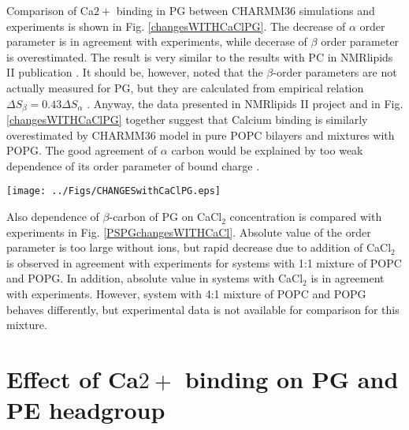 \documentclass[aps,prl,superscriptaddress,twocolumn]{revtex4}
\begin{document}
Comparison of Ca$2+$ binding in PG between CHARMM36 simulations and experiments \cite{borle85}
is shown in Fig. \ref{changesWITHCaClPG}. The decrease of $\alpha$ order parameter
is in agreement with experiments, while decerase of $\beta$ order parameter is overestimated.
The result is very similar to the results with PC in NMRlipids II publication \cite{catte16}.
It should be, however, noted that the $\beta$-order parameters are not actually measured for PG,
but they are calculated from empirical relation $\Delta S_{\beta}=0.43\Delta S_{\alpha}$ \cite{akutsu81}.
Anyway, the data presented in NMRlipids II project and in Fig. \ref{changesWITHCaClPG} together
suggest that Calcium binding is similarly overestimated by CHARMM36 model in pure POPC bilayers and mixtures with
POPG. The good agreement of $\alpha$ carbon would be explained by too weak dependence of its order
parameter of bound charge
.
\begin{figure*}[]
  \centering
  \texttt{[image: ../Figs/CHANGESwithCaClPG.eps]}
  \caption{\label{changesWITHCaClPG}
    PG order parameters as a function CaCl$_2$ concentration from experiments \cite{borle85} and CHARMM36 simulations.
    Note that beta order parameter is calculated from empirical relation $\Delta S_{\beta}=0.43\Delta S_{\alpha}$ \cite{akutsu81}, not actually measured. 
  }
\end{figure*}

Also dependence of $\beta$-carbon of PG on CaCl$_2$ concentration is compared with
experiments \cite{borle85} in Fig. \ref{PSPGchangesWITHCaCl}. Absolute value of
the order parameter is too large without ions, but rapid decrease due to addition of
CaCl$_2$ is observed in agreement with experiments for systems with 1:1 mixture of POPC and POPG.
In addition, absolute value in systems with CaCl$_2$ is in agreement with experiments.
However, system with 4:1 mixture of POPC and POPG behaves differently, but experimental
data is not available for comparison for this mixture.



\section{Effect of Ca$2+$ binding on PG and PE headgroup}
\end{document}
